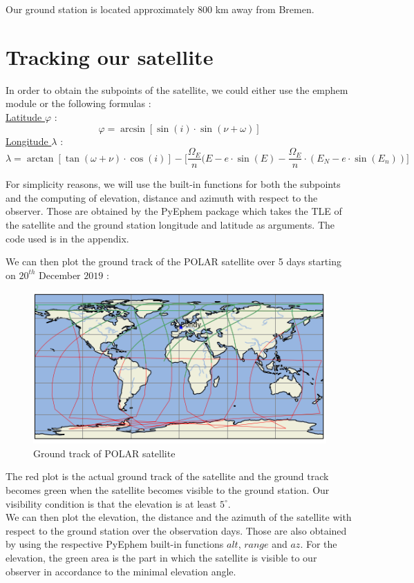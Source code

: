 \documentclass[a4paper,12pt,calibri,oneside,openany]{book}
\theoremstyle{break}
\begin{document}
Our ground station is located approximately $800$ km away from Bremen.
\chapter{Tracking our satellite}
In order to obtain the subpoints of the satellite, we could either use the emphem module or the following formulas : \\
\underline{Latitude $\varphi$} :
$$
\varphi = \arcsin[\sin(i)\cdot \sin(\nu + \omega)]
$$
\underline{Longitude $\lambda$} :
$$
\lambda = \arctan[\tan(\omega + \nu)\cdot \cos(i)] - \bigg[\frac{\Omega_E}n (E-e\cdot\sin(E) - \frac{\Omega_E}{n}\cdot (E_N - e\cdot\sin(E_n))\bigg]
$$

For simplicity reasons, we will use the built-in functions for both the subpoints and the computing of elevation, distance and azimuth with respect to the observer. Those are obtained by the PyEphem package which takes the TLE of the satellite and the ground station longitude and latitude as arguments. The code used is in the appendix.

We can then plot the ground track of the POLAR satellite over 5 days starting on $20^{th}$ December $2019$ :

\begin{figure}[H]
	\centering
	\includegraphics[width=0.9\linewidth]{groundtrack}
	\caption{Ground track of POLAR satellite}
\end{figure}

The red plot is the actual ground track of the satellite and the ground track becomes green when the satellite becomes visible to the ground station. Our visibility condition is that the elevation is at least $5^\circ$.\\

We can then plot the elevation, the distance and the azimuth of the satellite with respect to the ground station over the observation days. Those are also obtained by using the respective PyEphem built-in functions $alt$, $range$ and $az$. For the elevation, the green area is the part in which the satellite is visible to our observer in accordance to the minimal elevation angle.
\end{document}
